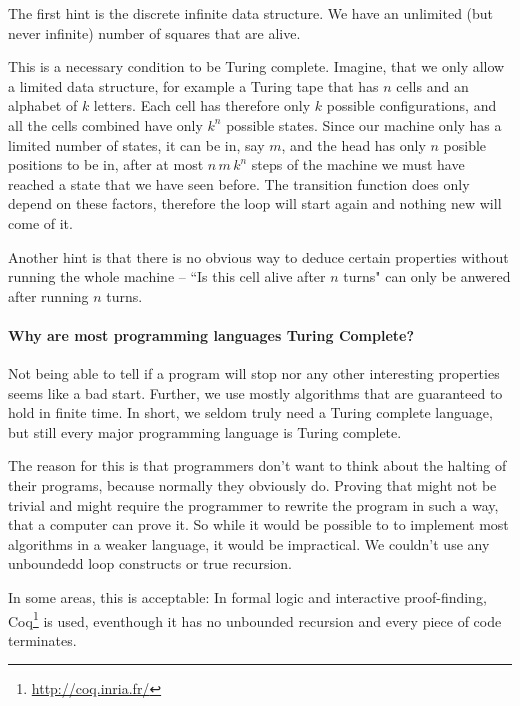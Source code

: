 The first hint is the discrete infinite data structure. We have an unlimited (but 
never infinite) number of squares that are alive. 

This is a necessary condition to be Turing complete. Imagine, that we only
allow a limited data structure, for example a Turing tape that has $n$ cells
and an alphabet of $k$ letters. Each cell has therefore only $k$ possible
configurations, and all the cells combined have only $k^n$ possible states.
Since our machine only has a limited number of states, it can be in, say $m$,
and the head has only $n$ posible positions to be in, after at most 
$n\, m\, k^n$ steps of the machine we must have reached a state that we have
seen before.  The transition function does only depend on these factors,
therefore the loop will start again and nothing new will come of it.

Another hint is that there is no obvious way to deduce certain properties 
without running the whole machine -- ``Is this cell alive after $n$ turns" 
can only be anwered after running $n$ turns.
\TODO

\paragraph{Why are most programming languages Turing Complete?} %
\label{sub:Why are most programming languages Turing Complete?}
Not being able to tell if a program will stop nor any other interesting 
properties seems like a bad start. Further, we use mostly algorithms that are
guaranteed to hold in finite time. In short, we seldom truly need a Turing 
complete language, but still every major programming language is Turing 
complete. 

The reason for this is that programmers don't want to think about the halting 
of their programs, because normally they obviously do. Proving that might not 
be trivial and might require the programmer to rewrite the program in such a 
way, that a computer can prove it. So while it would be possible to to 
implement most algorithms in a weaker language, it would be impractical. We
couldn't use any unboundedd loop constructs or true recursion.

In some areas, this is acceptable: In formal logic and interactive 
proof-finding, Coq\footnote{\url{http://coq.inria.fr/}} is used, eventhough it has 
no unbounded recursion and every piece of code terminates.
